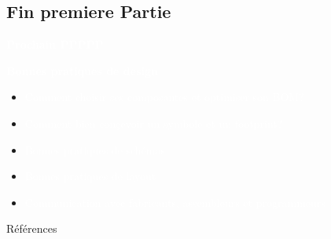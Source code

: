 \maketoc









\pauseframe%






\subsection{Fin premiere Partie}
\chapterframe










%



\titlebackground
\thankyouframe


\introbackground
\begin{frame}
    \centering
    \Large

    \textcolor{white}{\LARGE{\textbf{Prochain PPPPP}}}\\
    \vspace{18pt}

    \textcolor{white}{
    \LARGE{\textbf{Bonnes pratiques de design}}}\\
    \vspace{24pt}

    \begin{itemize}
        \item \textcolor{white}{Comment choisir ses composantes et optimiser son BOM?}
        \item \textcolor{white}{Comment bien conçevoir un symbole et un footprint?}
        \item \textcolor{white}{Bonnes pratiques de schémas}
        \item \textcolor{white}{Bonnes pratiques de layout}
        \item \textcolor{white}{Communication avec fabricants, assembleurs et programmeurs}
    \end{itemize}
\end{frame}

\begin{frame}[allowframebreaks]{Références}
    \printbibliography
\end{frame}




